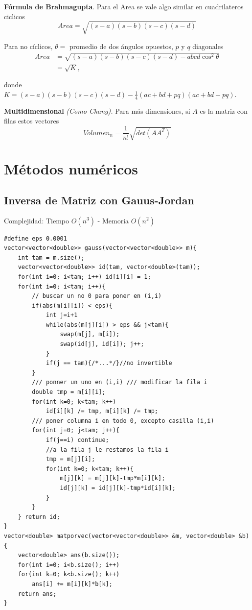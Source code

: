 \documentclass[12 pts,spanish,mexico]{article}
\newcommand{\Pa}[1]{\left( #1 \right)}
\numberwithin{equation}{section}
\begin{document}
\begin{multicols}{2}
\textbf{Fórmula de Brahmagupta}. Para el Area se vale algo similar en cuadrilateros ciclicos
\begin{equation*}
    Area = \sqrt{(s-a)(s-b)(s-c)(s-d)}
\end{equation*}

Para no cíclicos, $\theta=$ promedio de dos ángulos opuestos, $p$ y $q$ diagonales
\begin{align*}
    Area &= \sqrt{(s-a)(s-b)(s-c)(s-d)-abcd \cos^2\theta}\\
    &=\sqrt{K},
\end{align*}

donde $K = (s-a)(s-b)(s-c)(s-d) - \frac{1}{4}(ac+bd+pq)(ac+bd-pq)$.

\textbf{Multidimensional} \textit{(Como Chang).} Para más dimensiones, si $A$ es la matriz con filas estos vectores
\begin{equation*}
    Volumen_n = \frac{1}{n!} \sqrt{det\Pa{AA^T}}
\end{equation*}


\section{Métodos numéricos}

\subsection{Inversa de Matriz con Gauus-Jordan}
Complejidad: Tiempo $O\left(n^3\right)$ - Memoria $O\left(n^2\right)$
\begin{verbatim}
#define eps 0.0001
vector<vector<double>> gauss(vector<vector<double>> m){
    int tam = m.size();
    vector<vector<double>> id(tam, vector<double>(tam));
    for(int i=0; i<tam; i++) id[i][i] = 1;
    for(int i=0; i<tam; i++){
        // buscar un no 0 para poner en (i,i)
        if(abs(m[i][i]) < eps){
            int j=i+1
            while(abs(m[j][i]) > eps && j<tam){
                swap(m[j], m[i]);
                swap(id[j], id[i]); j++;
            }
            if(j == tam){/*...*/}//no invertible
        }
        /// ponner un uno en (i,i) /// modificar la fila i
        double tmp = m[i][i];
        for(int k=0; k<tam; k++)
            id[i][k] /= tmp, m[i][k] /= tmp;
        /// poner columna i en todo 0, excepto casilla (i,i)
        for(int j=0; j<tam; j++){
            if(j==i) continue;
            //a la fila j le restamos la fila i
            tmp = m[j][i];
            for(int k=0; k<tam; k++){
                m[j][k] = m[j][k]-tmp*m[i][k];
                id[j][k] = id[j][k]-tmp*id[i][k];
            }
        }
    } return id;
}
vector<double> matporvec(vector<vector<double>> &m, vector<double> &b){
    vector<double> ans(b.size());
    for(int i=0; i<b.size(); i++)
    for(int k=0; k<b.size(); k++)
        ans[i] += m[i][k]*b[k];
    return ans;
}
\end{verbatim}



\end{multicols}
\end{document}
